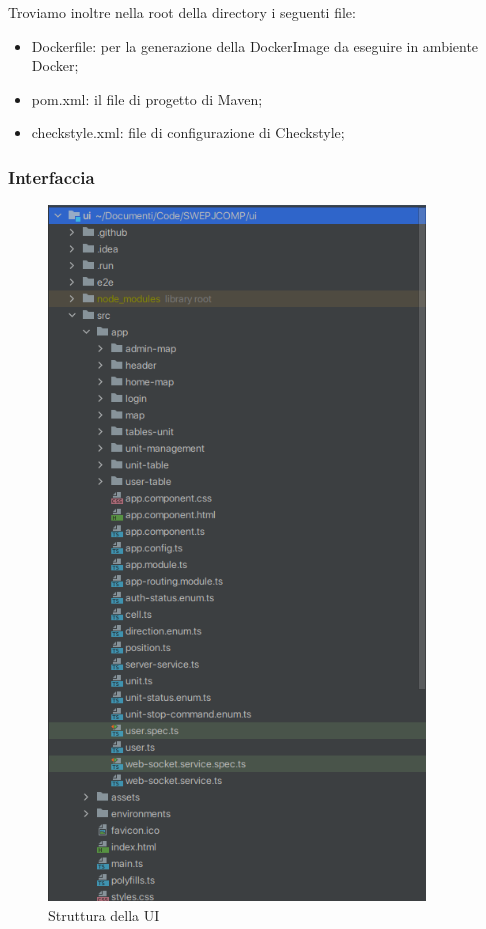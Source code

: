 	Troviamo inoltre nella root della directory i seguenti file:
	\begin{itemize}
		\item{Dockerfile}: per la generazione della DockerImage da eseguire in ambiente Docker;
		\item{pom.xml}: il file di progetto di Maven;
		\item{checkstyle.xml}: file di configurazione di Checkstyle;
	\end{itemize}

\newpage

	\subsubsection{Interfaccia}
	
	\begin{figure}[H]
		\centering
		\includegraphics[width=10cm]{img/struttura_ui.png}
		\caption{Struttura della UI}
	\end{figure}

